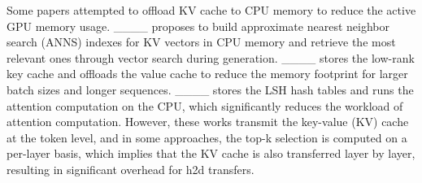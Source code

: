 Some papers attempted to offload KV cache to CPU memory to reduce the active GPU memory usage. ____ proposes to build approximate nearest neighbor search (ANNS) indexes for KV vectors in CPU memory and retrieve the most relevant ones through vector search during generation. ____ stores the low-rank key cache and offloads the value cache to reduce the memory footprint for larger batch sizes and longer sequences. ____ stores the LSH hash tables and runs the attention computation on the CPU, which significantly reduces the workload of attention computation. However, these works transmit the key-value (KV) cache at the token level, and in some approaches, the top-k selection is computed on a per-layer basis, which implies that the KV cache is also transferred layer by layer, resulting in significant overhead for h2d transfers.